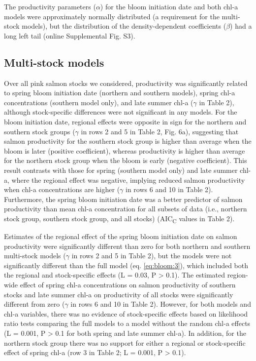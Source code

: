 The productivity parameters (\(\alpha\)) for the bloom initiation date and both
chl-a models were approximately normally distributed (a requirement for the
multi-stock models), but the distribution of the density-dependent coefficients
(\(\beta\)) had a long left tail (online Supplemental Fig. S3).

\subsection{Multi-stock models}

Over all pink salmon stocks we considered, productivity was significantly
related to spring bloom initiation date (northern and southern models), spring
chl-a concentrations (southern model only), and late summer chl-a (\(\gamma\) in
Table 2), although stock-specific differences were not significant in any
models. For the bloom initiation date, regional effects were opposite in sign
for the northern and southern stock groups (\(\gamma\) in rows 2 and 5 in Table
2, Fig. 6a), suggesting that salmon productivity for the southern stock group is
higher than average when the bloom is later (positive coefficient), whereas
productivity is higher than average for the northern stock group when the bloom
is early (negative coefficient). This result contrasts with those for spring
(southern model only) and late summer chl-a, where the regional effect was
negative, implying reduced salmon productivity when chl-a concentrations are
higher (\(\gamma\) in rows 6 and 10 in Table 2). Furthermore, the spring bloom
initiation date was a better predictor of salmon productivity than mean chl-a
concentration for all subsets of data (i.e., northern stock group, southern
stock group, and all stocks) (AIC\textsubscript{C} values in Table 2).

Estimates of the regional effect of the spring bloom initiation date on salmon
productivity were significantly different than zero for both northern and
southern multi-stock models (\(\gamma\) in rows 2 and 5 in Table 2), but the
models were not significantly different than the full model (eq. \ref{eq:bloom:3}), which
included both the regional and stock-specific effects (L = 0.03, P
\textgreater{} 0.1). The estimated region-wide effect of spring chl-a
concentrations on salmon productivity of southern stocks and late summer chl-a
on productivity of all stocks were significantly different from zero (\(\gamma\)
in rows 6 and 10 in Table 2). However, for both models and chl-a variables,
there was no evidence of stock-specific effects based on likelihood ratio tests
comparing the full models to a model without the random chl-a effects (L =
0.001, P \textgreater{} 0.1 for both spring and late summer chl-a). In addition,
for the northern stock group there was no support for either a regional or
stock-specific effect of spring chl-a (row 3 in Table 2; L = 0.001, P
\textgreater{} 0.1).

